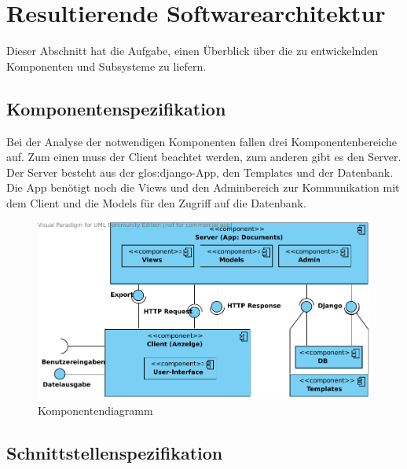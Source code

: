 \chapter{Resultierende Softwarearchitektur}

Dieser Abschnitt hat die Aufgabe, einen Überblick über die zu entwickelnden
Komponenten und Subsysteme zu liefern.
\section{Komponentenspezifikation}

Bei der Analyse der notwendigen Komponenten fallen drei Komponentenbereiche auf.
Zum einen muss der Client beachtet werden, zum anderen gibt es den Server. Der
Server besteht aus der \gls{glos:django}-App, den Templates und der Datenbank. Die App
benötigt noch die Views und den Adminbereich zur Kommunikation mit dem Client
und die Models für den Zugriff auf die Datenbank.

\begin{figure}[h]
    \begin{center}
\includegraphics[width=0.8\linewidth]{bilder/Komponentendiagramm.pdf}
\caption[Komponentendiagramm]{Komponentendiagramm}
\label{Komponentendiagramm}
    \end{center}
\end{figure}

\section{Schnittstellenspezifikation}

